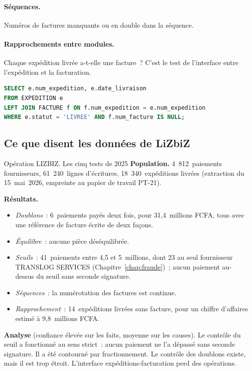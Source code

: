 \paragraph{Séquences.} Numéros de factures manquants ou en double dans la
séquence.

\paragraph{Rapprochements entre modules.} Chaque expédition livrée a-t-elle
une facture~? C'est le test de l'interface entre l'expédition et la
facturation.
\begin{lstlisting}[language=SQL]
SELECT e.num_expedition, e.date_livraison
FROM EXPEDITION e
LEFT JOIN FACTURE f ON f.num_expedition = e.num_expedition
WHERE e.statut = 'LIVREE' AND f.num_facture IS NULL;
\end{lstlisting}

\subsection{Ce que disent les données de LiZbiZ}

\begin{boxscenario}{Opération LIZBIZ. Les cinq tests de 2025}
\textbf{Population.} 4~812~paiements fournisseurs, 61~240~lignes
d'écritures, 18~340~expéditions livrées (extraction du 15~mai~2026, empreinte
au papier de travail PT-21).

\medskip
\textbf{Résultats.}
\begin{itemize}
    \item \emph{Doublons}~: 6~paiements payés deux fois, pour 31,4~millions
          FCFA, tous avec une référence de facture écrite de deux façons.
    \item \emph{Équilibre}~: aucune pièce déséquilibrée.
    \item \emph{Seuils}~: 41~paiements entre 4,5 et 5~millions, dont 23 au
          seul fournisseur TRANSLOG SERVICES (Chapitre~\ref{chap:fraude})~;
          aucun paiement au-dessus du seuil sans seconde signature.
    \item \emph{Séquences}~: la numérotation des factures est continue.
    \item \emph{Rapprochement}~: 14~expéditions livrées sans facture, pour un
          chiffre d'affaires estimé à 9,8~millions FCFA.
\end{itemize}

\medskip
\textbf{Analyse} (confiance élevée sur les faits, moyenne sur les causes).
Le contrôle du seuil a fonctionné au sens strict~: aucun paiement ne l'a
dépassé sans seconde signature. Il a été contourné par fractionnement.
Le contrôle des doublons existe, mais il est trop étroit. L'interface
expéditions-facturation perd des opérations.
\end{boxscenario}

